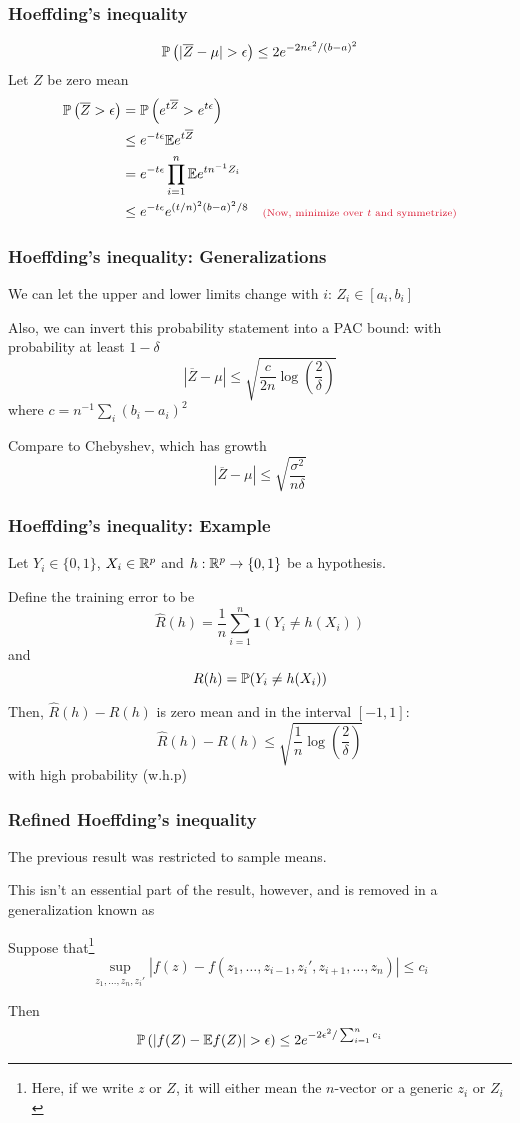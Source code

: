 \documentclass[12pt]{beamer}
\newcommand{\parenthetical}[2]{#1  \scriptstyle \alr{( #2)}}
\begin{document}
\begin{frame}[fragile]
\frametitle{Hoeffding's inequality}
\[
\P\left( |\overline{Z} - \mu| > \epsilon\right) \leq 2e^{-2n\epsilon^2/(b-a)^2}
\]
 Let $Z$ be zero mean
\begin{align*}
\P\left( \overline{Z} > \epsilon\right)
& 
=
\P\left( e^{t\overline{Z}} > e^{t\epsilon}\right) \\
& \leq e^{-t\epsilon} \E e^{t\overline{Z}} \\
& = e^{-t\epsilon} \prod_{i=1}^n\E e^{tn^{-1}Z_i} \\
& \leq
e^{-t\epsilon}e^{(t/n)^2(b-a)^2/8} \parenthetical{\quad}{\textrm{Now, minimize over $t$ and symmetrize}}
\end{align*}
\end{frame}

\begin{frame}[fragile]
\frametitle{Hoeffding's inequality: Generalizations}
We can let the upper and lower limits change with $i$: $Z_i \in [a_i,b_i]$

\vsp
Also, we can invert this probability statement into a PAC bound:  with probability at least $1-\delta$
\[
|\overline{Z} - \mu| \leq \sqrt{\frac{c}{2n}\log\left(\frac{2}{\delta}\right)}
\]
where $c = n^{-1}\sum_i (b_i - a_i)^2$

\vsp
Compare to Chebyshev, which has growth
\[
|\overline{Z} - \mu| \leq \sqrt{\frac{\sigma^2}{n\delta}}
\]
\end{frame}

\begin{frame}[fragile]
\frametitle{Hoeffding's inequality: Example}
Let $Y_i \in \{0,1\}$, $X_i \in \R^p$ and $h:\R^p \rightarrow \{0,1\}$ be a hypothesis.
\vsp

Define the training error to be
\[
\hat{R}(h) = \frac{1}{n} \sum_{i=1}^n \mathbf{1}(Y_i \neq h(X_i))
\]
and 
\[
R(h) = \P (Y_i \neq h(X_i))
\]

Then, $\hat{R}(h) - R(h)$ is zero mean and in the interval $[-1,1]$:
\[
\hat{R}(h) - R(h) \leq \sqrt{\frac{1}{n}\log\left(\frac{2}{\delta}\right)}
\]
with high probability (w.h.p)
\end{frame}

\begin{frame}[fragile]
\frametitle{Refined Hoeffding's inequality}
The previous result was restricted to sample means.  

\vsp
This isn't an essential part of the result, however, and is removed in a generalization
known as 

\vsp
Suppose that\footnote{Here, if we write $z$ or $Z$, it will either mean the $n$-vector or a generic $z_i$ or $Z_i$}
\[
\sup_{z_1,\ldots,z_n,z_i'} \left| f(z) - f(z_1,\ldots,z_{i-1},z_i',z_{i+1},\ldots,z_n) \right| \leq c_i
\]

Then
\[
\P\left( |f(Z) - \E f(Z)| > \epsilon\right) \leq 2e^{-2\epsilon^2/\sum_{i=1}^nc_i}
\]

\end{frame}
\end{document}
